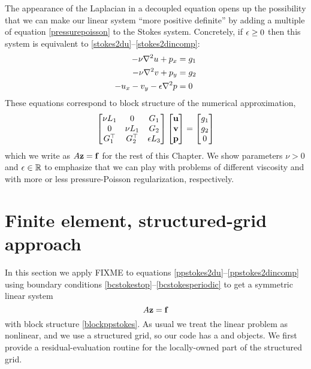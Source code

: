 The appearance of the Laplacian in a decoupled equation opens up the possibility that we can make our linear system ``more positive definite'' by adding a multiple of equation \eqref{pressurepoisson} to the Stokes system.  Concretely, if $\epsilon\ge 0$ then this system is equivalent to \eqref{stokes2du}--\eqref{stokes2dincomp}:
\begin{align}
-\nu \nabla^2 u + p_x &= g_1 \label{ppstokes2du} \\
-\nu \nabla^2 v + p_y &= g_2 \label{ppstokes2dv} \\
- u_x - v_y - \epsilon \nabla^2 p &= 0 \label{ppstokes2dincomp}
\end{align}
These equations correspond to block structure of the numerical approximation,
\begin{equation}
\begin{bmatrix}
    \nu L_1 & 0 & G_1 \\
    0 & \nu L_1 & G_2 \\
    G_1^\top & G_2^\top & \epsilon L_3
    \end{bmatrix}
    \begin{bmatrix}
    \mathbf{u} \\ \mathbf{v} \\ \mathbf{p}
    \end{bmatrix}
    =
    \begin{bmatrix}
    g_1 \\ g_2 \\ 0
    \end{bmatrix} \label{blockppstokes}
\end{equation}
which we write as $A\mathbf{z} = \mathbf{f}$ for the rest of this Chapter.  We show parameters $\nu>0$ and $\epsilon \in \mathbb{R}$ to emphasize that we can play with problems of different viscosity and with more or less pressure-Poisson regularization, respectively. 


\section{Finite element, structured-grid approach}

In this section we apply FIXME to equations \eqref{ppstokes2du}--\eqref{ppstokes2dincomp} using boundary conditions \eqref{bcstokestop}--\eqref{bcstokesperiodic} to get a symmetric linear system
\begin{equation}
  A \mathbf{z} = \mathbf{f} \label{linsysstokes}
\end{equation}
with block structure \eqref{blockppstokes}.  As usual we treat the linear problem as nonlinear, and we use a structured grid, so our code has a \pSNES and \pDMDA objects.  We first provide a residual-evaluation routine for the locally-owned part of the structured grid.

